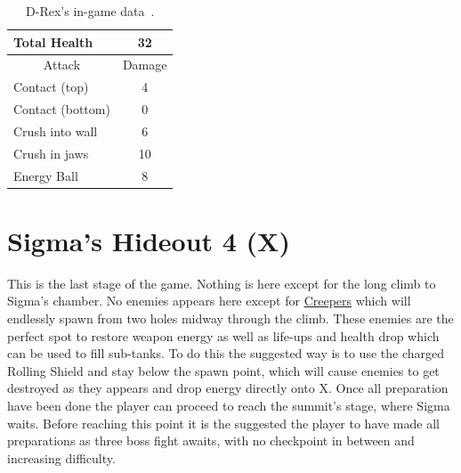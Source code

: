 \begin{table}
	\centering
	\begin{tabular}[htp]{l c}
		\toprule
		Total Health  & 32\\
		\midrule
		\multicolumn{1}{c}{Attack} & \multicolumn{1}{c}{Damage}\\
		Contact (top) & 4\\
		Contact (bottom) & 0\\
		Crush into wall & 6\\
		Crush in jaws & 10\\
		Energy Ball & 8\\
		\bottomrule
	\end{tabular}
	\caption{D-Rex's in-game data~\cite{wiki:D-REX}.}
\end{table}
\chapter{Sigma's Hideout 4 (X)}
This is the last stage of the game. Nothing  is here except for the long climb to Sigma's chamber. No enemies appears here except for \hyperlink{enem:Creeper}{Creepers} which will endlessly spawn from two holes midway through the climb. These enemies are the perfect spot to restore weapon energy as well as life-ups and health drop which can be used to fill sub-tanks. To do this the suggested way is to use the charged Rolling Shield and stay below the spawn point, which will cause enemies to get destroyed as they appears and drop energy directly onto X. Once all preparation have been done the player can proceed to reach the summit's stage, where Sigma waits. Before reaching this point it is the suggested the player to have made all preparations as three boss fight awaits, with no checkpoint in between and increasing difficulty.

